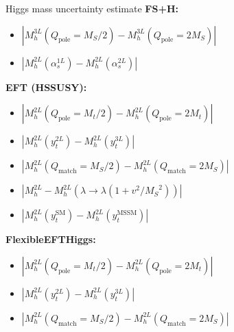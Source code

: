 \documentclass[hyperref={pdfpagelabels=false},ngerman]{beamer}
\newcommand{\MS}{\ensuremath{M_S}}
\renewcommand{\emph}{\textbf}
\newcommand{\SM}{\ensuremath{\text{SM}}}
\newcommand{\MSSM}{\ensuremath{\text{MSSM}}}
\newcommand{\pole}{\ensuremath{\text{pole}}}
\newcommand{\as}{\alpha_s}
\begin{document}
\begin{frame}[noframenumbering]{Higgs mass uncertainty estimate}
  \emph{FS+H:}
  \begin{itemize}
  \item $|M_h^{3L}(Q_\pole = \MS/2) - M_h^{3L}(Q_\pole = 2\MS)|$
  \item $|M_h^{2L}(\as^{1L}) - M_h^{2L}(\as^{2L})|$
  \end{itemize}
  \emph{EFT (HSSUSY):}
  \begin{itemize}
  \item $|M_h^{2L}(Q_\pole = M_t/2) - M_h^{2L}(Q_\pole = 2M_t)|$
  \item $|M_h^{2L}(y_t^{2L}) - M_h^{2L}(y_t^{3L})|$
  \item $|M_h^{2L}(Q_{\text{match}} = \MS/2) - M_h^{2L}(Q_{\text{match}} = 2\MS)|$
  \item $|M_h^{2L} - M_h^{2L}(\lambda \rightarrow \lambda(1 + v^2/\MS^2))|$
  \item $|M_h^{2L}(y_t^\SM) - M_h^{2L}(y_t^\MSSM)|$
  \end{itemize}
  \emph{FlexibleEFTHiggs:}
  \begin{itemize}
  \item $|M_h^{2L}(Q_\pole = M_t/2) - M_h^{2L}(Q_\pole = 2M_t)|$
  \item $|M_h^{2L}(y_t^{2L}) - M_h^{2L}(y_t^{3L})|$
  \item $|M_h^{2L}(Q_{\text{match}} = \MS/2) - M_h^{2L}(Q_{\text{match}} = 2\MS)|$
  \end{itemize}
\end{frame}
\end{document}
